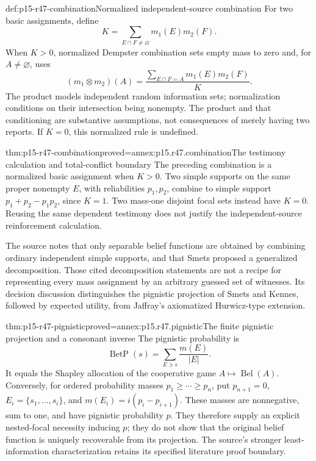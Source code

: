 \begin{hbdefinition}{def:p15-r47-combination}{Normalized independent-source combination}
For two basic assignments, define
\[
 K=\sum_{E\cap F\ne\varnothing}m_1(E)m_2(F).
\]
When \(K>0\), normalized Dempster combination sets empty mass to zero and,
for \(A\ne\varnothing\), uses
\[
 (m_1\otimes m_2)(A)=
    \frac{\sum_{E\cap F=A}m_1(E)m_2(F)}{K}.
\]
The product models independent random information sets; normalization
conditions on their intersection being nonempty. The product and that
conditioning are substantive assumptions, not consequences of merely having
two reports. If \(K=0\), this normalized rule is undefined.
\end{hbdefinition}

\begin{hbtheorem}{thm:p15-r47-combination}{proved=annex:p15.r47.combination}{The testimony calculation and total-conflict boundary}
The preceding combination is a normalized basic assignment when \(K>0\).
Two simple supports on the same proper nonempty \(E\), with reliabilities
\(p_1,p_2\), combine to simple support
\(p_1+p_2-p_1p_2\), since \(K=1\). Two mass-one disjoint focal sets
instead have \(K=0\). Reusing the same dependent testimony does not justify
the independent-source reinforcement calculation.
\end{hbtheorem}

The source notes that only separable belief functions are obtained by
combining ordinary independent simple supports, and that Smets proposed
a generalized decomposition. Those cited decomposition statements are not
a recipe for representing every mass assignment by an arbitrary guessed
set of witnesses. Its decision discussion distinguishes the pignistic
projection of Smets and Kennes, followed by expected utility, from Jaffray's
axiomatized Hurwicz-type extension.

\begin{hbtheorem}{thm:p15-r47-pignistic}{proved=annex:p15.r47.pignistic}{The finite pignistic projection and a consonant inverse}
The pignistic probability is
\[
 \operatorname{BetP}(s)=\sum_{E\ni s}\frac{m(E)}{|E|}.
\]
It equals the Shapley allocation of the cooperative game
\(A\mapsto\operatorname{Bel}(A)\). Conversely, for ordered probability
masses \(p_1\geq\cdots\geq p_n\), put \(p_{n+1}=0\),
\(E_i=\{s_1,\ldots,s_i\}\), and \(m(E_i)=i(p_i-p_{i+1})\).
These masses are nonnegative, sum to one, and have pignistic probability
\(p\). They therefore supply an explicit nested-focal necessity inducing
\(p\); they do not show that the original belief function is uniquely
recoverable from its projection. The source's stronger least-information
characterization retains its specified literature proof boundary.
\end{hbtheorem}

